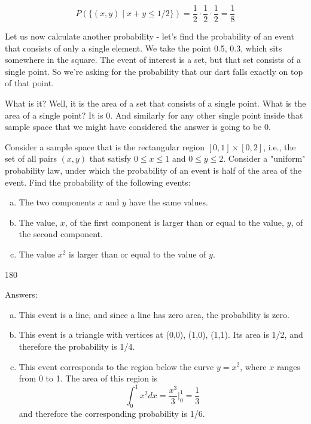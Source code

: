 \documentclass{tufte-handout}
\begin{document}
$$
P\left(  \{(x, y) \mid x + y \leq 1/2   \}   \right) = \frac{1}{2} \cdot \frac{1}{2} \cdot \frac{1}{2} = \frac{1}{8} 
$$

\vspace{0.7cm}
Let us now calculate another probability - let's find the probability of an event that consists of only a single element. We
take the point 0.5, 0.3, which sits somewhere in the square. The event of interest is a set, but that set consists of
a single point. So we're asking for the probability that our dart falls exactly on top of that point.

What is it? Well, it is the area of a set that consists of a single point. What is the area of a single point?
It is 0. And similarly for any other single point inside that sample space that we might have considered
the answer is going to be 0.

 Consider a sample space that is the rectangular region
$[0, 1] \times [0, 2]$, i.e., the set of all pairs $(x, y)$ that satisfy $0 \leq x \leq 1$ and $0 \leq y \leq 2$.
 Consider a "uniform" probability law, under which the probability of an event is half of the area of the event. 
 Find the probability of the following events:
 \begin{enumerate}[(a)]
 \item The two components $x$ and $y$ have the same values.
 \item The value, $x$, of the first component is larger than or equal to the value, $y$, of the second component.
  \item The value $x^2$ is larger than or equal to the value of $y$. 
 \end{enumerate}


\vspace{1cm}

\begin{turn}{180} 
\color{teal}
\begin{minipage}{\linewidth}
Answers:
\scriptsize
\begin{enumerate}[(a)]
\item This event is a line, and since a line has zero area, the probability is zero.
\item  This event is a triangle with vertices at (0,0), (1,0), (1,1). Its area is 1/2, and therefore the probability is 1/4.
\item This event corresponds to the region below the curve $y=x^2$, where $x$ ranges from 0 to 1. The area of this region is
$$
\int_{0}^{1} x^2 dx = \frac{x^3}{3} \bigg\rvert_0^1 = \frac{1}{3}
$$
and therefore the corresponding probability is 1/6.
\end{enumerate}
\end{minipage}
\end{turn}
\end{document}
